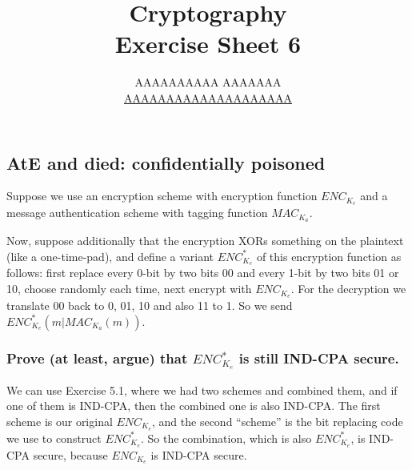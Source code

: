 \documentclass{article}
\title{Cryptography \\ Exercise Sheet 6}
\author{
  AAAAAAAAAA AAAAAAA \\
  \href{mailto:AAAAAAAAAAAAAAAAAAAA}{AAAAAAAAAAAAAAAAAAAA}
}
\begin{document}
  \maketitle

  \setcounter{section}{6}
  \subsection{AtE and died: confidentially poisoned}
  \begin{centerframebox}
    Suppose we use an encryption scheme with encryption function $ENC_{K_e}$
    and a message authentication scheme with tagging function $MAC_{K_a}$.

    Now, suppose additionally that the encryption XORs something on the plaintext (like a one-time-pad),
    and define a variant $ENC^*_{K_e}$ of this encryption function as follows:
    first replace every 0-bit by two bits 00 and every 1-bit by two bits 01 or 10,
    choose randomly each time, next encrypt with $ENC_{K_e}$.
    For the decryption we translate 00 back to 0, 01, 10 and also 11 to 1. So we send $ENC^*_{K_e} (m| MAC_{K_a} (m))$.
  \end{centerframebox}
  \subsubsection{Prove (at least, argue) that $ENC^*_{K_e}$ is still IND-CPA secure.}
  We can use Exercise 5.1, where we had two schemes and combined them,
  and if one of them is IND-CPA, then the combined one is also IND-CPA.
  The first scheme is our original $ENC_{K_e}$, and the second ``scheme'' is the bit replacing code we use to construct $ENC^*_{K_e}$.
  So the combination, which is also $ENC^*_{K_e}$, is IND-CPA secure, because $ENC_{K_e}$ is IND-CPA secure.
\end{document}
